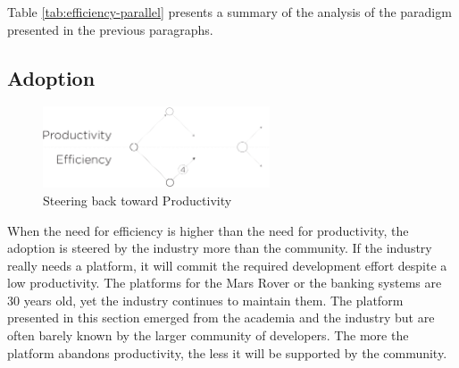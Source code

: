 Table \ref{tab:efficiency-parallel} presents a summary of the analysis of the paradigm presented in the previous paragraphs.








\subsection{Adoption} \label{chapter3:software-efficiency:adoption}

\begin{figure}[!h]
\begin{center}
\includegraphics[width=0.6\textwidth]{../resources/state-of-the-art-4.pdf}
\end{center}
\caption{Steering back toward Productivity}
\label{fig:state-of-the-art-4}
\end{figure}


When the need for efficiency is higher than the need for productivity, the adoption is steered by the industry more than the community.
If the industry really needs a platform, it will commit the required development effort despite a low productivity.
The platforms for the Mars Rover or the banking systems are 30 years old, yet the industry continues to maintain them.
The platform presented in this section emerged from the academia and the industry but are often barely known by the larger community of developers.
The more the platform abandons productivity, the less it will be supported by the community.





